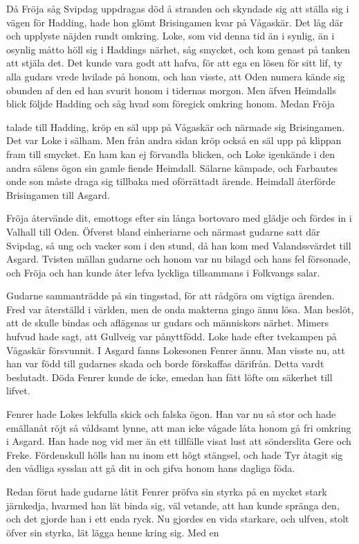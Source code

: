 Då Fröja såg Svipdag uppdragas död å stranden och skyndade sig att
ställa sig i vägen för Hadding, hade hon glömt Brisingamen kvar på
Vågaskär. Det låg där och upplyste näjden rundt omkring. Loke, som vid
denna tid än i synlig, än i osynlig måtto höll sig i Haddings närhet,
såg smycket, och kom genast på tanken att stjäla det. Det kunde vara
godt att hafva, för att ega en lösen för sitt lif, ty alla gudars vrede
hvilade på honom, och han visste, att Oden numera kände sig obunden af
den ed han svurit honom i tidernas morgon. Men äfven Heimdalls blick
följde Hadding och såg hvad som föregick omkring honom. Medan Fröja

talade till Hadding, kröp en säl upp på Vågaskär och närmade sig
Brisingamen. Det var Loke i sälham. Men från andra sidan kröp också en
säl upp på klippan fram till smycket. En ham kan ej förvandla blicken,
och Loke igenkände i den andra sälens ögon sin gamle fiende Heimdall.
Sälarne kämpade, och Farbautes onde son måste draga sig tillbaka med
oförrättadt ärende. Heimdall återförde Brisingamen till Asgard.

Fröja återvände dit, emottogs efter sin långa bortovaro med glädje och
fördes in i Valhall till Oden. Öfverst bland einheriarne och närmast
gudarne satt där Svipdag, så ung och vacker som i den stund, då han kom
med Valandssvärdet till Asgard. Tvisten mällan gudarne och honom var nu
bilagd och hans fel försonade, och Fröja och han kunde åter lefva
lyckliga tillsammans i Folkvangs salar.

Gudarne sammanträdde på sin tingsstad, för att rådgöra om vigtiga
ärenden. Fred var återställd i världen, men de onda makterna gingo ännu
lösa. Man beslöt, att de skulle bindas och aflägsnas ur gudars och
människors närhet. Mimers hufvud hade sagt, att Gullveig var pånyttfödd.
Loke hade efter tvekampen på Vågaskär försvunnit. I Asgard fanns
Lokesonen Fenrer ännu. Man visste nu, att han var född till gudarnes
skada och borde förskaffas därifrån. Detta vardt beslutadt. Döda Fenrer
kunde de icke, emedan han fått löfte om säkerhet till lifvet.

Fenrer hade Lokes lekfulla skick och falska ögon. Han var nu så stor och
hade emällanåt röjt så våldsamt lynne, att man icke vågade låta honom gå
fri omkring i Asgard. Han hade nog vid mer än ett tillfälle visat lust
att sönderslita Gere och Freke. Fördenskull hölls han nu inom ett högt
stängsel, och hade Tyr åtagit sig den vådliga sysslan att gå dit in och
gifva honom hans dagliga föda.

Redan förut hade gudarne låtit Fenrer pröfva sin styrka på en mycket
stark järnkedja, hvarmed han lät binda sig, väl vetande, att han kunde
spränga den, och det gjorde han i ett enda ryck. Nu gjordes en vida
starkare, och ulfven, stolt öfver sin styrka, lät lägga henne kring sig.
Med en

